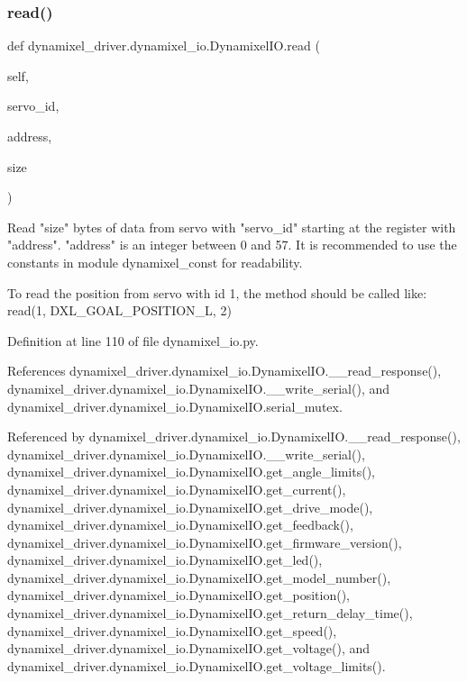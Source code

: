 \subsubsection{\texorpdfstring{read()}{read()}}
{\footnotesize\ttfamily def dynamixel\+\_\+driver.\+dynamixel\+\_\+io.\+Dynamixel\+I\+O.\+read (\begin{DoxyParamCaption}\item[{}]{self,  }\item[{}]{servo\+\_\+id,  }\item[{}]{address,  }\item[{}]{size }\end{DoxyParamCaption})}

\begin{DoxyVerb}Read "size" bytes of data from servo with "servo_id" starting at the
register with "address". "address" is an integer between 0 and 57. It is
recommended to use the constants in module dynamixel_const for readability.

To read the position from servo with id 1, the method should be called
like:
    read(1, DXL_GOAL_POSITION_L, 2)
\end{DoxyVerb}
 

Definition at line 110 of file dynamixel\+\_\+io.\+py.



References dynamixel\+\_\+driver.\+dynamixel\+\_\+io.\+Dynamixel\+I\+O.\+\_\+\+\_\+read\+\_\+response(), dynamixel\+\_\+driver.\+dynamixel\+\_\+io.\+Dynamixel\+I\+O.\+\_\+\+\_\+write\+\_\+serial(), and dynamixel\+\_\+driver.\+dynamixel\+\_\+io.\+Dynamixel\+I\+O.\+serial\+\_\+mutex.



Referenced by dynamixel\+\_\+driver.\+dynamixel\+\_\+io.\+Dynamixel\+I\+O.\+\_\+\+\_\+read\+\_\+response(), dynamixel\+\_\+driver.\+dynamixel\+\_\+io.\+Dynamixel\+I\+O.\+\_\+\+\_\+write\+\_\+serial(), dynamixel\+\_\+driver.\+dynamixel\+\_\+io.\+Dynamixel\+I\+O.\+get\+\_\+angle\+\_\+limits(), dynamixel\+\_\+driver.\+dynamixel\+\_\+io.\+Dynamixel\+I\+O.\+get\+\_\+current(), dynamixel\+\_\+driver.\+dynamixel\+\_\+io.\+Dynamixel\+I\+O.\+get\+\_\+drive\+\_\+mode(), dynamixel\+\_\+driver.\+dynamixel\+\_\+io.\+Dynamixel\+I\+O.\+get\+\_\+feedback(), dynamixel\+\_\+driver.\+dynamixel\+\_\+io.\+Dynamixel\+I\+O.\+get\+\_\+firmware\+\_\+version(), dynamixel\+\_\+driver.\+dynamixel\+\_\+io.\+Dynamixel\+I\+O.\+get\+\_\+led(), dynamixel\+\_\+driver.\+dynamixel\+\_\+io.\+Dynamixel\+I\+O.\+get\+\_\+model\+\_\+number(), dynamixel\+\_\+driver.\+dynamixel\+\_\+io.\+Dynamixel\+I\+O.\+get\+\_\+position(), dynamixel\+\_\+driver.\+dynamixel\+\_\+io.\+Dynamixel\+I\+O.\+get\+\_\+return\+\_\+delay\+\_\+time(), dynamixel\+\_\+driver.\+dynamixel\+\_\+io.\+Dynamixel\+I\+O.\+get\+\_\+speed(), dynamixel\+\_\+driver.\+dynamixel\+\_\+io.\+Dynamixel\+I\+O.\+get\+\_\+voltage(), and dynamixel\+\_\+driver.\+dynamixel\+\_\+io.\+Dynamixel\+I\+O.\+get\+\_\+voltage\+\_\+limits().


